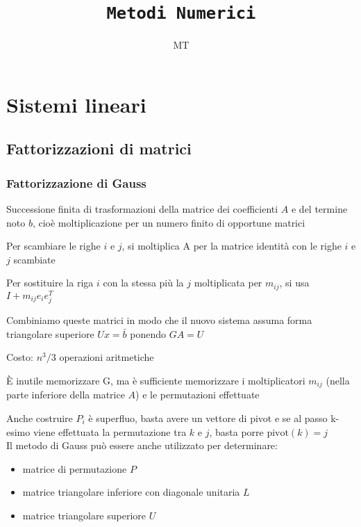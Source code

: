 \documentclass[openany]{book}
\title{\Huge \texttt{Metodi Numerici}}
\date{}
\author{\textsf{MT}}
\begin{document}
\maketitle

\tableofcontents

\chapter{Sistemi lineari}

\section{Fattorizzazioni di matrici}

\subsection{Fattorizzazione di Gauss}

Successione finita di trasformazioni della matrice dei coefficienti $A$ e del termine noto $b$, cioè moltiplicazione per un numero finito di opportune matrici

Per scambiare le righe $i$ e $j$, si moltiplica A per la matrice identità con le righe $ i $  e $ j$  scambiate

Per sostituire la riga $ i$ con la stessa più la $ j$ moltiplicata per $m_{ij}$, si usa $ I + m_{ij}e_ie_j^T$

Combiniamo queste matrici in modo che il nuovo sistema assuma forma triangolare superiore $ Ux = \bar{b} $ ponendo $ GA = U $

Costo: $ n^3/3$ operazioni aritmetiche 

È inutile memorizzare G, ma è sufficiente memorizzare i moltiplicatori $ m_{ij}$ (nella parte inferiore della matrice $A$) e le permutazioni effettuate 

Anche costruire $P_i$ è superfluo, basta avere un vettore di pivot e se al passo k-esimo viene effettuata la permutazione tra $k$ e $j$, basta porre $\text{pivot}(k)=j$ 
\\

Il metodo di Gauss può essere anche utilizzato per determinare: 

\begin{itemize}
	\item matrice di permutazione $P$
	\item matrice triangolare inferiore con diagonale unitaria  $L$
	\item matrice triangolare superiore $U$
\end{itemize}
\end{document}

